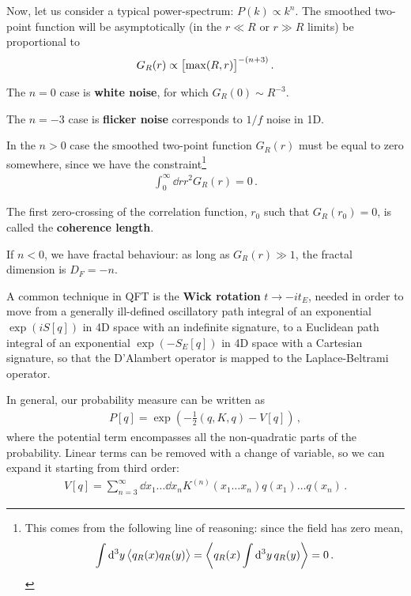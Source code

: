 \documentclass[main.tex]{subfiles}
\begin{document}
Now, let us consider a typical power-spectrum: \(P(k) \propto k^{n}\). 
The smoothed two-point function will be asymptotically (in the \(r \ll R\) or \(r \gg R\) limits) be proportional to
%
\begin{align}
G_R (r) \propto \qty[\max(R, r)]^{- (n+3)}
\,.
\end{align}

The \(n = 0\) case is \textbf{white noise}, for which \(G_R(0) \sim R^{-3}\). 


The \(n = -3\) case is \textbf{flicker noise} corresponds to \(1/f\) noise in 1D.

In the \(n > 0\) case the smoothed two-point function \(G_R(r)\) must be equal to zero somewhere, since we have the constraint\footnote{This comes from the following line of reasoning: since the field has zero mean, 
%
\begin{align}
\int \dd[3]{y} \expval{q_R (x) q_R (y)} = \expval{q_R (x) \int \dd[3]{y} q_R(y)} = 0
\,.
\end{align}}
%
\begin{align}
\int_0^{\infty } \dd{r} r^2 G_R(r) = 0
\,.
\end{align}


The first zero-crossing of the correlation function, \(r_0 \) such that \(G_R(r_0 ) = 0\), is called the \textbf{coherence length}. 

If \(n < 0\), we have fractal behaviour: as long as \(G_R(r) \gg 1\), the fractal dimension is \(D_F = -n\). 

A common technique in QFT is the \textbf{Wick rotation} \(t \to -i t_E\), needed in order to move from a generally ill-defined oscillatory path integral of an exponential \(\exp(i S[q])\) in 4D space with an indefinite signature, to a Euclidean path integral of an exponential \(\exp(- S_E[q])\) in 4D space with a Cartesian signature, so that the D'Alambert operator is mapped to the Laplace-Beltrami operator.

In general, our probability measure can be written as 
%
\begin{align}
P[q] = \exp(- \frac{1}{2} (q, K, q) - V[q])
\,,
\end{align}
%
where the potential term encompasses all the non-quadratic parts of the probability. Linear terms can be removed with a change of variable, so we can expand it starting from third order: 
%
\begin{align}
V[q] = \sum _{n=3}^{\infty } \dd{x_1 } \dots \dd{x_n} K^{(n)} (x_1 \dots x_n) q(x_1 )\dots q(x_n)
\,.
\end{align}
\end{document}
